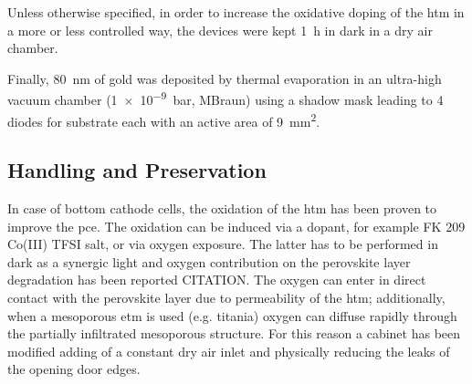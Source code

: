 			Unless otherwise specified, in order to increase the
			oxidative doping of the \gls{htm} in a more or less controlled way, the devices were kept \SI{1}{\hour} in dark in a dry air chamber.

			Finally, \SI{80}{\nm} of gold was deposited by thermal evaporation in an ultra-high vacuum chamber
			(\SI{1e-9}{\bar}, MBraun) using a shadow mask leading to 4 diodes for substrate each with an active area of
			\SI{9}{\mm\squared}.

	\subsection{Handling and Preservation}
		In case of bottom cathode cells, the oxidation of the \gls{htm} has been proven to improve the \gls{pce}. The oxidation can be induced via a dopant, for example FK 209 Co(III) TFSI salt\cite{Burschka2013}, or via oxygen exposure. The latter has to be performed in dark as a synergic light and oxygen contribution on the perovskite layer degradation has been reported CITATION. The oxygen can enter in direct contact with the perovskite layer due to permeability of the \gls{htm}; additionally, when a mesoporous \gls{etm} is used (e.g. titania) oxygen can diffuse rapidly through the partially infiltrated mesoporous structure. For this reason a cabinet has been modified adding of a constant dry air inlet and physically reducing the leaks of the opening door edges.

		\begin{figure}%
			\label{fig:microscope_degradation}
		\end{figure}

